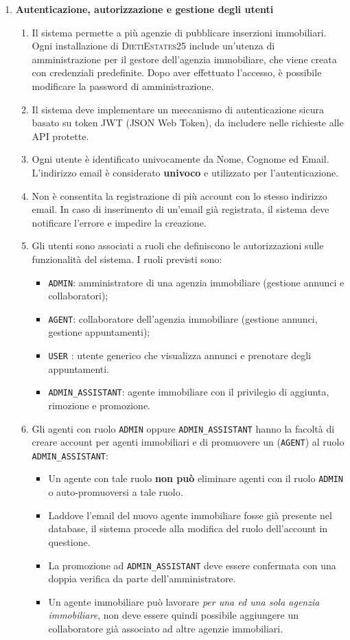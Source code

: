 \begin{enumerate}
	\item \textbf{Autenticazione, autorizzazione e gestione degli utenti}
	\begin{enumerate}
		\item Il sistema permette a più agenzie di pubblicare inserzioni immobiliari. Ogni installazione di \textsc{DietiEstates25} include un'utenza di amministrazione per il gestore dell'agenzia immobiliare, che viene creata con credenziali predefinite. Dopo aver effettuato l'accesso, è possibile modificare la password di amministrazione.
		\item Il sistema deve implementare un meccanismo di autenticazione sicura basato su token JWT (JSON Web Token), da includere nelle richieste alle API protette.
		\item Ogni utente è identificato univocamente da Nome, Cognome ed Email. L'indirizzo email è considerato \textbf{univoco} e utilizzato per l'autenticazione.
		\item Non è consentita la registrazione di più account con lo stesso indirizzo email. In caso di inserimento di un'email già registrata, il sistema deve notificare l'errore e impedire la creazione.
		\item Gli utenti sono associati a ruoli che definiscono le autorizzazioni sulle funzionalità del sistema. I ruoli previsti sono:
		\begin{itemize}
			\item \texttt{ADMIN}: amministratore di una agenzia immobiliare (gestione annunci e collaboratori);
			\item \texttt{AGENT}: collaboratore dell'agenzia immobiliare (gestione annunci, gestione appuntamenti);
			\item \texttt{USER} : utente generico che visualizza annunci e prenotare degli appuntamenti.
			\item \texttt{ADMIN\_ASSISTANT}: agente immobiliare con il privilegio di aggiunta, rimozione e promozione.
		\end{itemize}
		\item Gli agenti con ruolo \texttt{ADMIN} oppure \texttt{ADMIN\_ASSISTANT} hanno la facoltà di creare account per agenti immobiliari e di promuovere un (\texttt{AGENT}) al ruolo \texttt{ADMIN\_ASSISTANT}:
		\begin{itemize}
			\item Un agente con tale ruolo \textbf{non può} eliminare agenti con il ruolo \texttt{ADMIN} o auto-promuoversi a tale ruolo.
			\item Laddove l'email del nuovo agente immobiliare fosse già presente nel database, il sistema procede alla modifica del ruolo dell'account in questione.
			\item La promozione ad \texttt{ADMIN\_ASSISTANT} deve essere confermata con una doppia verifica da parte dell'amministratore.
			\item Un agente immobiliare può lavorare \textit{per una ed una sola agenzia immobiliare}, non deve essere quindi possibile aggiungere un collaboratore già associato ad altre agenzie immobiliari.
		\end{itemize}
	\end{enumerate}


\end{enumerate}
